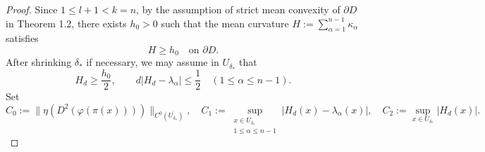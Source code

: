 \documentclass[reqno,a4paper]{amsart}
\numberwithin{equation}{section}
\begin{document}
\begin{proof}
		Since $1\leq l+1<k = n$, by the assumption of strict mean convexity of $\partial D$ in Theorem 1.2, there exists $h_0 > 0$ such that the mean curvature $H := \sum_{\alpha=1}^{n-1} \kappa_\alpha$ satisfies
		\[
		H \ge h_0 \quad \text{on } \partial D.
		\]
		After shrinking $\delta_*$ if necessary, we may assume in $U_{\delta_*}$ that
		\begin{equation}
			H_d \ge \frac{h_0}{2}, \qquad 
			d |H_d - \lambda_\alpha| \le \frac{1}{2} \quad (1 \le \alpha \le n-1). 
		\end{equation}
		Set
		\[
		C_0 := \| \eta(D^2(\varphi(\pi(x)))) \|_{C^0(\overline{U_{\delta_*}})}, \quad
		C_1 := \sup_{\substack{x \in U_{\delta_*} \\ 1 \le \alpha \le n-1}} |H_d(x) - \lambda_\alpha(x)|,\quad 
		C_2 := \sup_{x\in U_{\delta_*}} |H_d(x)|.
		\]
		

\end{proof}
\end{document}
